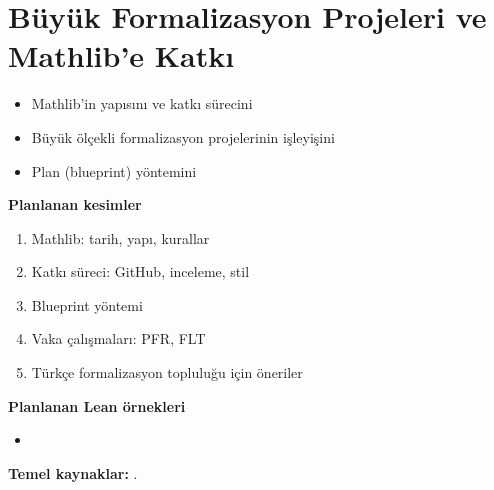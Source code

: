 \chapter{Büyük Formalizasyon Projeleri ve Mathlib'e Katkı}\label{bol:projeler}

\begin{bolumhedefleri}
\begin{itemize}
  \item Mathlib'in yapısını ve katkı sürecini
  \item Büyük ölçekli formalizasyon projelerinin işleyişini
  \item Plan (blueprint) yöntemini
\end{itemize}
\end{bolumhedefleri}

\begin{taslakplan}
\textbf{Planlanan kesimler}
\begin{enumerate}[label=\thechapter.\arabic*, leftmargin=2.4em]
  \item Mathlib: tarih, yapı, kurallar
  \item Katkı süreci: GitHub, inceleme, stil
  \item Blueprint yöntemi
  \item Vaka çalışmaları: PFR, FLT
  \item Türkçe formalizasyon topluluğu için öneriler
\end{enumerate}

\textbf{Planlanan Lean örnekleri}
\begin{itemize}
  \item {}
\end{itemize}

\textbf{Temel kaynaklar:} \citet{mathlib2020,pfr,flt}.
\end{taslakplan}


